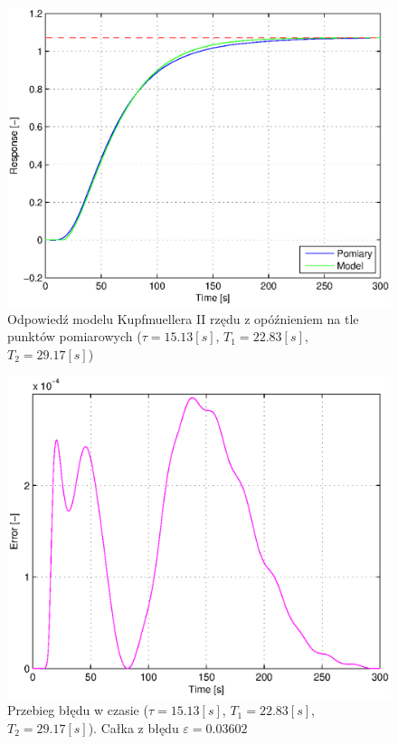 \documentclass[12pt]{article}
\begin{document}
\begin{figure}[!htp]
	\begin{center}
		\includegraphics[width=13cm]{../res/img/step21.eps}
	\end{center} 
	\caption{Odpowiedź modelu Kupfmuellera II rzędu z opóźnieniem na tle punktów
	pomiarowych ($\tau=15.13[s]$, $T_1=22.83[s]$, $T_2=29.17[s]$)}
\end{figure}

\begin{figure}[!htp]
	\begin{center}
		\includegraphics[width=13cm]{../res/img/err21.eps}
	\end{center} 
	\caption{Przebieg błędu w czasie ($\tau=15.13[s]$, $T_1=22.83[s]$,
	$T_2=29.17[s]$).
	Całka z błędu $\varepsilon=0.03602$}
\end{figure}
\end{document}
